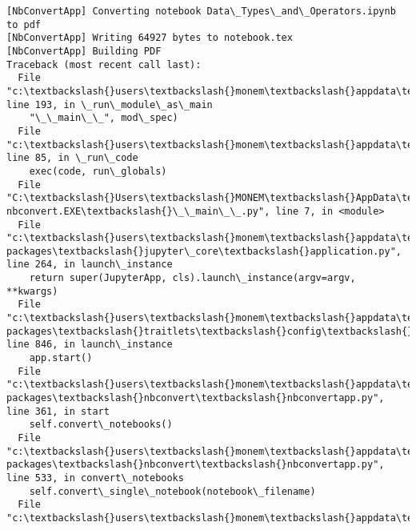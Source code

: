 \documentclass[11pt]{article}
\begin{document}
    \begin{Verbatim}[commandchars=\\\{\}]
[NbConvertApp] Converting notebook Data\_Types\_and\_Operators.ipynb to pdf
[NbConvertApp] Writing 64927 bytes to notebook.tex
[NbConvertApp] Building PDF
Traceback (most recent call last):
  File "c:\textbackslash{}users\textbackslash{}monem\textbackslash{}appdata\textbackslash{}local\textbackslash{}programs\textbackslash{}python\textbackslash{}python37\textbackslash{}lib\textbackslash{}runpy.py",
line 193, in \_run\_module\_as\_main
    "\_\_main\_\_", mod\_spec)
  File "c:\textbackslash{}users\textbackslash{}monem\textbackslash{}appdata\textbackslash{}local\textbackslash{}programs\textbackslash{}python\textbackslash{}python37\textbackslash{}lib\textbackslash{}runpy.py",
line 85, in \_run\_code
    exec(code, run\_globals)
  File "C:\textbackslash{}Users\textbackslash{}MONEM\textbackslash{}AppData\textbackslash{}Local\textbackslash{}Programs\textbackslash{}Python\textbackslash{}Python37\textbackslash{}Scripts\textbackslash{}jupyter-
nbconvert.EXE\textbackslash{}\_\_main\_\_.py", line 7, in <module>
  File "c:\textbackslash{}users\textbackslash{}monem\textbackslash{}appdata\textbackslash{}local\textbackslash{}programs\textbackslash{}python\textbackslash{}python37\textbackslash{}lib\textbackslash{}site-
packages\textbackslash{}jupyter\_core\textbackslash{}application.py", line 264, in launch\_instance
    return super(JupyterApp, cls).launch\_instance(argv=argv, **kwargs)
  File "c:\textbackslash{}users\textbackslash{}monem\textbackslash{}appdata\textbackslash{}local\textbackslash{}programs\textbackslash{}python\textbackslash{}python37\textbackslash{}lib\textbackslash{}site-
packages\textbackslash{}traitlets\textbackslash{}config\textbackslash{}application.py", line 846, in launch\_instance
    app.start()
  File "c:\textbackslash{}users\textbackslash{}monem\textbackslash{}appdata\textbackslash{}local\textbackslash{}programs\textbackslash{}python\textbackslash{}python37\textbackslash{}lib\textbackslash{}site-
packages\textbackslash{}nbconvert\textbackslash{}nbconvertapp.py", line 361, in start
    self.convert\_notebooks()
  File "c:\textbackslash{}users\textbackslash{}monem\textbackslash{}appdata\textbackslash{}local\textbackslash{}programs\textbackslash{}python\textbackslash{}python37\textbackslash{}lib\textbackslash{}site-
packages\textbackslash{}nbconvert\textbackslash{}nbconvertapp.py", line 533, in convert\_notebooks
    self.convert\_single\_notebook(notebook\_filename)
  File "c:\textbackslash{}users\textbackslash{}monem\textbackslash{}appdata\textbackslash{}local\textbackslash{}programs\textbackslash{}python\textbackslash{}python37\textbackslash{}lib\textbackslash{}site-

\end{Verbatim}
\end{document}
